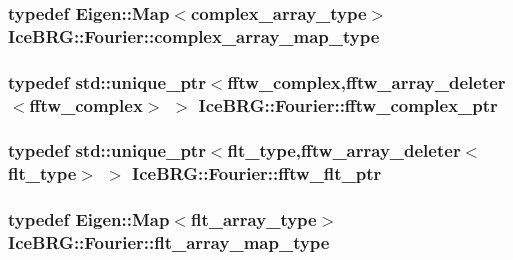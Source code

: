\subsubsection[{complex\+\_\+array\+\_\+map\+\_\+type}]{\setlength{\rightskip}{0pt plus 5cm}typedef Eigen\+::\+Map$<${\bf complex\+\_\+array\+\_\+type}$>$ {\bf Ice\+B\+R\+G\+::\+Fourier\+::complex\+\_\+array\+\_\+map\+\_\+type}}\label{namespaceIceBRG_1_1Fourier_a647364fe9550c95ba04a10e0228b3c8d}
\hypertarget{namespaceIceBRG_1_1Fourier_adbfb704fc18fb22a63f5d6c6b080fcd1}{}
\subsubsection[{fftw\+\_\+complex\+\_\+ptr}]{\setlength{\rightskip}{0pt plus 5cm}typedef std\+::unique\+\_\+ptr$<$fftw\+\_\+complex,{\bf fftw\+\_\+array\+\_\+deleter}$<$fftw\+\_\+complex$>$ $>$ {\bf Ice\+B\+R\+G\+::\+Fourier\+::fftw\+\_\+complex\+\_\+ptr}}\label{namespaceIceBRG_1_1Fourier_adbfb704fc18fb22a63f5d6c6b080fcd1}
\hypertarget{namespaceIceBRG_1_1Fourier_ad7f59ed7cb7a3053346be0e1102a5af3}{}
\subsubsection[{fftw\+\_\+flt\+\_\+ptr}]{\setlength{\rightskip}{0pt plus 5cm}typedef std\+::unique\+\_\+ptr$<${\bf flt\+\_\+type},{\bf fftw\+\_\+array\+\_\+deleter}$<${\bf flt\+\_\+type}$>$ $>$ {\bf Ice\+B\+R\+G\+::\+Fourier\+::fftw\+\_\+flt\+\_\+ptr}}\label{namespaceIceBRG_1_1Fourier_ad7f59ed7cb7a3053346be0e1102a5af3}
\hypertarget{namespaceIceBRG_1_1Fourier_a6fc544fe13bd85c16ab9f67052e1a882}{}
\subsubsection[{flt\+\_\+array\+\_\+map\+\_\+type}]{\setlength{\rightskip}{0pt plus 5cm}typedef Eigen\+::\+Map$<${\bf flt\+\_\+array\+\_\+type}$>$ {\bf Ice\+B\+R\+G\+::\+Fourier\+::flt\+\_\+array\+\_\+map\+\_\+type}}\label{namespaceIceBRG_1_1Fourier_a6fc544fe13bd85c16ab9f67052e1a882}


